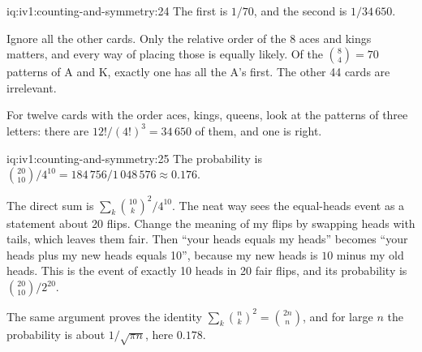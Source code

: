 \begin{solution}{iq:iv1:counting-and-symmetry:24}
The first is $1/70$, and the second is $1/34\,650$.

Ignore all the other cards. Only the relative order of the 8 aces and kings matters, and every way of placing those is equally likely. Of the $\binom{8}{4} = 70$ patterns of A and K, exactly one has all the A's first. The other 44 cards are irrelevant.

For twelve cards with the order aces, kings, queens, look at the patterns of three letters: there are $12!/(4!)^3 = 34\,650$ of them, and one is right.


\end{solution}

\begin{solution}{iq:iv1:counting-and-symmetry:25}
The probability is $\binom{20}{10}/4^{10} = 184\,756/1\,048\,576 \approx 0.176$.

The direct sum is $\sum_k \binom{10}{k}^2 / 4^{10}$. The neat way sees the equal-heads event as a statement about 20 flips. Change the meaning of my flips by swapping heads with tails, which leaves them fair. Then ``your heads equals my heads'' becomes ``your heads plus my new heads equals 10'', because my new heads is $10$ minus my old heads. This is the event of exactly 10 heads in 20 fair flips, and its probability is $\binom{20}{10}/2^{20}$.

The same argument proves the identity $\sum_k \binom{n}{k}^2 = \binom{2n}{n}$, and for large $n$ the probability is about $1/\sqrt{\pi n}$, here $0.178$.

\end{solution}

